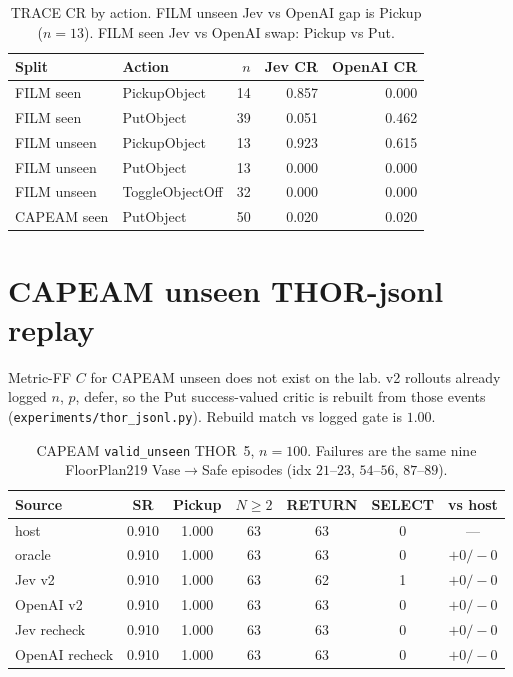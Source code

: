 \documentclass[11pt]{article}
\begin{document}
\begin{table}[t]
\centering
\caption{TRACE CR by action. FILM unseen Jev vs OpenAI gap is Pickup ($n{=}13$). FILM seen Jev vs OpenAI swap: Pickup vs Put.}
\label{tab:replay-action}
\scriptsize
\begin{tabular}{llrrr}
\toprule
Split & Action & $n$ & Jev CR & OpenAI CR \\
\midrule
FILM seen & PickupObject & 14 & 0.857 & 0.000 \\
FILM seen & PutObject & 39 & 0.051 & 0.462 \\
FILM unseen & PickupObject & 13 & 0.923 & 0.615 \\
FILM unseen & PutObject & 13 & 0.000 & 0.000 \\
FILM unseen & ToggleObjectOff & 32 & 0.000 & 0.000 \\
CAPEAM seen & PutObject & 50 & 0.020 & 0.020 \\
\bottomrule
\end{tabular}
\end{table}

\section{CAPEAM unseen THOR-jsonl replay}
\label{sec:capeam-unseen}

Metric-FF $C$ for CAPEAM unseen does not exist on the lab. v2 rollouts already logged $n$, $p$, defer, so the Put success-valued critic is rebuilt from those events (\texttt{experiments/thor\_jsonl.py}). Rebuild match vs logged gate is $1.00$.

\begin{table}[t]
\centering
\caption{CAPEAM \texttt{valid\_unseen} THOR~5, $n{=}100$. Failures are the same nine FloorPlan219 Vase$\to$Safe episodes (idx $21$--$23$, $54$--$56$, $87$--$89$).}
\label{tab:capeam-unseen-jsonl}
\scriptsize
\begin{tabular}{lcccccc}
\toprule
Source & SR & Pickup & $N\ge 2$ & RETURN & SELECT & vs host \\
\midrule
host & 0.910 & 1.000 & 63 & 63 & 0 & --- \\
oracle & 0.910 & 1.000 & 63 & 63 & 0 & $+0/-0$ \\
Jev v2 & 0.910 & 1.000 & 63 & 62 & 1 & $+0/-0$ \\
OpenAI v2 & 0.910 & 1.000 & 63 & 63 & 0 & $+0/-0$ \\
\midrule
Jev recheck & 0.910 & 1.000 & 63 & 63 & 0 & $+0/-0$ \\
OpenAI recheck & 0.910 & 1.000 & 63 & 63 & 0 & $+0/-0$ \\
\bottomrule
\end{tabular}
\end{table}
\end{document}
